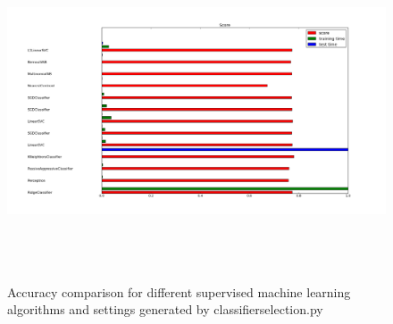 \begin{figure}[htp]
\centering
\includegraphics[width=15cm,height=10cm]{figs/scikitlearnclassifierperformance.png}
\caption{Accuracy comparison for different supervised machine learning algorithms and settings generated by classifierselection.py}\label{fig:bugsa}
\end{figure}

